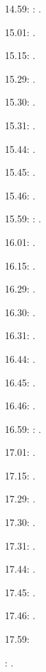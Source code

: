 \documentclass[italian]{article}
\begin{document}
14.59:     
:    .

15.01:     . 

15.15:     . 

15.29:     . 

15.30:     .

15.31:     .

15.44:     .

15.45:     .

15.46:     .

15.59:     
:    .

16.01:     . 

16.15:     . 

16.29:     . 

16.30:     .

16.31:     .

16.44:     .

16.45:     .

16.46:     .

16.59:     
:    .

17.01:     . 

17.15:     . 

17.29:     . 

17.30:     .

17.31:     .

17.44:     .

17.45:     .

17.46:     .

17.59:     

:    .
\end{document}
